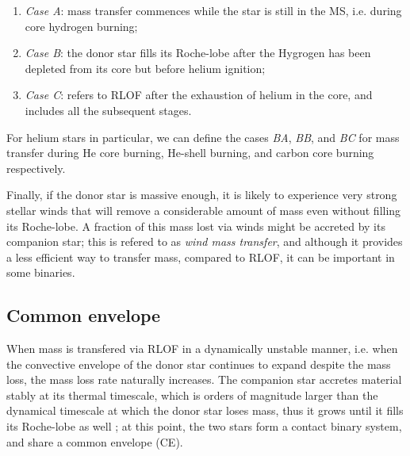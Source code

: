 \documentclass[../../main/thesis_msc.tex]{subfiles}
\begin{document}
				\begin{enumerate}[label=(\roman*)]
					\item \emph{Case A}: mass transfer commences while the star is still in the MS, i.e. during core hydrogen burning;
					\item \emph{Case B}: the donor star fills its Roche-lobe after the Hygrogen has been depleted from its core but before helium ignition;
					\item \emph{Case C}: refers to RLOF after the exhaustion of helium in the core, and includes all the subsequent stages.
				\end{enumerate}
				For helium stars in particular, we can define the cases \emph{BA}, \emph{BB}, and \emph{BC} for mass transfer during He core burning, He-shell burning, and carbon core burning respectively.
				
				Finally, if the donor star is massive enough, it is likely to experience very strong stellar winds that will remove a considerable amount of mass even without filling its Roche-lobe. A fraction of this mass lost via winds might be accreted by its companion star; this is refered to as \emph{wind mass transfer}, and although it provides a less efficient way to transfer mass, compared to RLOF, it can be important in some binaries.
				
			\subsection{Common envelope}
			
				When mass is transfered via RLOF in a dynamically unstable manner, i.e. when the convective envelope of the donor star continues to expand despite the mass loss, the mass loss rate naturally increases. The companion star accretes material stably at its thermal timescale, which is orders of magnitude larger than the dynamical timescale at which the donor star loses mass, thus it grows until it fills its Roche-lobe as well \citep{Izzard_CE}; at this point, the two stars form a contact binary system, and share a common envelope (CE).
				
\end{document}
